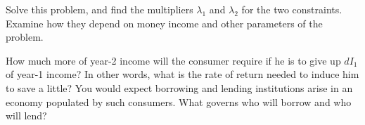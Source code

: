 Solve this problem, and find the multipliers $\lambda_1$ and $\lambda_2$ for the two constraints. Examine how they depend on money income and other parameters of the problem.

How much more of year-2 income will the consumer require if he is to give up $dI_1$ of year-1 income? In other words, what is the rate of return needed to induce him to save a little? You would expect borrowing and lending institutions arise in an economy populated by such consumers. What governs who will borrow and who will lend?













